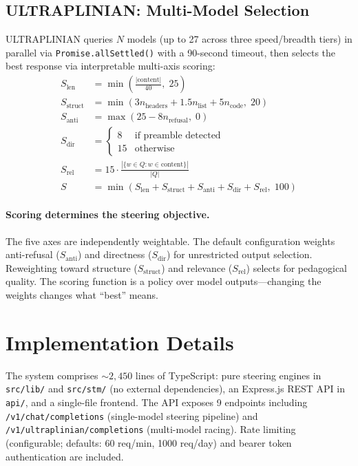 \documentclass[11pt]{article}
\begin{document}
\subsection{ULTRAPLINIAN: Multi-Model Selection}
\label{sec:ultraplinian}

ULTRAPLINIAN queries $N$ models (up to 27 across three speed/breadth tiers) in parallel via \texttt{Promise.allSettled()} with a 90-second timeout, then selects the best response via interpretable multi-axis scoring:
\begin{align}
    S_{\text{len}} &= \min\!\left(\frac{|\text{content}|}{40},\; 25\right) \\
    S_{\text{struct}} &= \min(3 n_{\text{headers}} + 1.5 n_{\text{list}} + 5 n_{\text{code}},\; 20) \\
    S_{\text{anti}} &= \max(25 - 8 n_{\text{refusal}},\; 0) \\
    S_{\text{dir}} &= \begin{cases} 8 & \text{if preamble detected} \\ 15 & \text{otherwise} \end{cases} \\
    S_{\text{rel}} &= 15 \cdot \frac{|\{w \in Q : w \in \text{content}\}|}{|Q|} \\
    S &= \min(S_{\text{len}} + S_{\text{struct}} + S_{\text{anti}} + S_{\text{dir}} + S_{\text{rel}},\; 100)
\end{align}

\paragraph{Scoring determines the steering objective.} The five axes are independently weightable. The default configuration weights anti-refusal ($S_{\text{anti}}$) and directness ($S_{\text{dir}}$) for unrestricted output selection. Reweighting toward structure ($S_{\text{struct}}$) and relevance ($S_{\text{rel}}$) selects for pedagogical quality. The scoring function is a policy over model outputs---changing the weights changes what ``best'' means.

\section{Implementation Details}

The system comprises ${\sim}2{,}450$ lines of TypeScript: pure steering engines in \texttt{src/lib/} and \texttt{src/stm/} (no external dependencies), an Express.js REST API in \texttt{api/}, and a single-file frontend. The API exposes 9 endpoints including \texttt{/v1/chat/completions} (single-model steering pipeline) and \texttt{/v1/ultraplinian/completions} (multi-model racing). Rate limiting (configurable; defaults: 60 req/min, 1000 req/day) and bearer token authentication are included.
\end{document}

